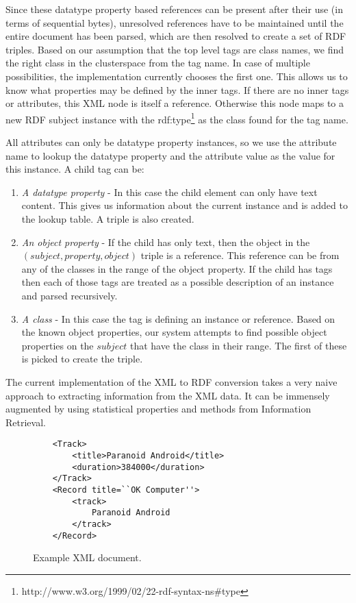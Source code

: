 \documentclass[journal]{IEEEtran}
\begin{document}
Since these datatype property based references can be present after their use
(in terms of sequential bytes), unresolved references have to be maintained
until the entire document has been parsed, which are then resolved to create
a set of RDF triples. Based on our assumption that the top level tags are class
names, we find the right class in the clusterspace from the tag name. In case
of multiple possibilities, the implementation currently chooses the first one.
This allows us to know what properties may be defined by the inner tags. If
there are no inner tags or attributes, this XML node is itself a reference.
Otherwise this node maps to a new RDF subject instance with the
rdf:type\footnote{http://www.w3.org/1999/02/22-rdf-syntax-ns\#type} as the
class found for the tag name.

All attributes can only be datatype property instances, so we use the attribute
name to lookup the datatype property and the attribute value as the value for
this instance. A child tag can be:
\begin{enumerate}
    \item \emph{A datatype property} - In this case the child element can only
        have text content. This gives us information about the current instance
        and is added to the lookup table. A triple is also created.
    \item \emph{An object property} - If the child has only text, then the
        object in the $(subject, property, object)$ triple is a reference. This
        reference can be from any of the classes in the range of the object
        property. If the child has tags then each of those tags are treated as
        a possible description of an instance and parsed recursively.
    \item \emph{A class} - In this case the tag is defining an instance or
        reference. Based on the known object properties, our system attempts to
        find possible object properties on the $subject$ that have the class in
        their range. The first of these is picked to create the triple.
\end{enumerate}

The current implementation of the XML to RDF conversion takes a very naive
approach to extracting information from the XML data. It can be immensely
augmented by using statistical properties and methods from Information
Retrieval.

\begin{figure}
    \caption{Example XML document.}
    \label{ex:xml-rec}
    \begin{verbatim}
    <Track>
        <title>Paranoid Android</title>
        <duration>384000</duration>
    </Track>
    <Record title=``OK Computer''>
        <track>
            Paranoid Android
        </track>
    </Record>
    \end{verbatim}
\end{figure}
\end{document}

